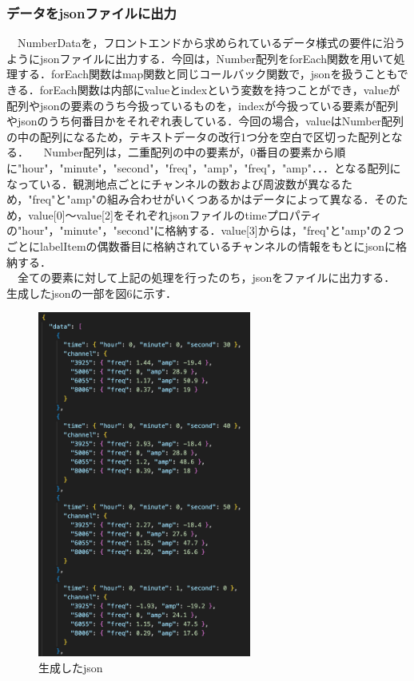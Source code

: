  \subsubsection{データをjsonファイルに出力}
　NumberDataを，フロントエンドから求められているデータ様式の要件に沿うようにjsonファイルに出力する．今回は，Number配列をforEach関数を用いて処理する．forEach関数はmap関数と同じコールバック関数で，jsonを扱うこともできる．forEach関数は内部にvalueとindexという変数を持つことができ，valueが配列やjsonの要素のうち今扱っているものを，indexが今扱っている要素が配列やjsonのうち何番目かをそれぞれ表している．今回の場合，valueはNumber配列の中の配列になるため，テキストデータの改行1つ分を空白で区切った配列となる．
　Number配列は，二重配列の中の要素が，0番目の要素から順に"hour"，"minute"，"second"，"freq"，"amp"，"freq"，"amp"．．．となる配列になっている．観測地点ごとにチャンネルの数および周波数が異なるため，"freq"と"amp"の組み合わせがいくつあるかはデータによって異なる．そのため，value[0]〜value[2]をそれぞれjsonファイルのtimeプロパティの"hour"，"minute"，"second"に格納する．value[3]からは，"freq"と"amp"の２つごとにlabelItemの偶数番目に格納されているチャンネルの情報をもとにjsonに格納する．\\
　全ての要素に対して上記の処理を行ったのち，jsonをファイルに出力する．\\
生成したjsonの一部を図6に示す．\\
\begin{figure}[h]
  \centering
  \includegraphics[width=70mm]{fig/jsonData.png}
  \caption{生成したjson}
\end{figure}

